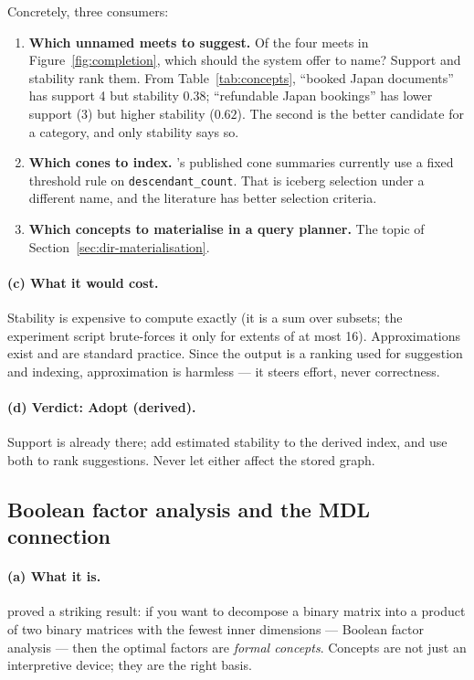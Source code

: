 Concretely, three consumers:

\begin{enumerate}[leftmargin=1.7em]
\item \textbf{Which unnamed meets to suggest.} Of the four meets in
  Figure~\ref{fig:completion}, which should the system offer to name? Support
  and stability rank them. From Table~\ref{tab:concepts}, ``booked Japan
  documents'' has support 4 but stability $0.38$; ``refundable Japan
  bookings'' has lower support (3) but higher stability ($0.62$). The second
  is the better candidate for a category, and only stability says so.
\item \textbf{Which cones to index.} \odag{}'s published cone summaries
  currently use a fixed threshold rule on \verb|descendant_count|. That is
  iceberg selection under a different name, and the \fca{} literature has
  better selection criteria.
\item \textbf{Which concepts to materialise in a query planner.} The topic of
  Section~\ref{sec:dir-materialisation}.
\end{enumerate}

\paragraph{(c) What it would cost.} Stability is expensive to compute exactly
(it is a sum over subsets; the experiment script brute-forces it only for
extents of at most 16). Approximations exist and are standard practice. Since
the output is a ranking used for suggestion and indexing, approximation is
harmless --- it steers effort, never correctness.

\paragraph{(d) Verdict: \textbf{Adopt (derived)}.} Support is already there;
add estimated stability to the derived index, and use both to rank
suggestions. Never let either affect the stored graph.

\subsection{Boolean factor analysis and the MDL connection}
\label{sec:learn-mdl}

\paragraph{(a) What it is.} \citet{belohlavek2010} proved a striking result:
if you want to decompose a binary matrix into a product of two binary matrices
with the fewest inner dimensions --- Boolean factor analysis --- then the
optimal factors are \emph{formal concepts}. Concepts are not just an
interpretive device; they are the right basis.

